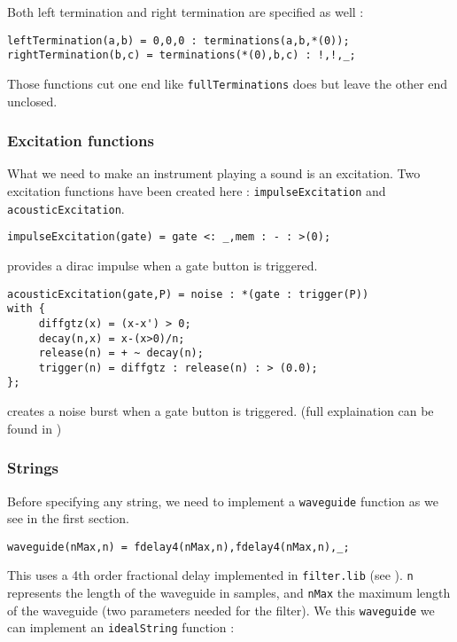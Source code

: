 Both left termination and right termination are specified as well :

\begin{lstlisting}
leftTermination(a,b) = 0,0,0 : terminations(a,b,*(0));
rightTermination(b,c) = terminations(*(0),b,c) : !,!,_;
\end{lstlisting}

Those functions cut one end like \texttt{fullTerminations} does but leave the other end unclosed.

\subsubsection*{Excitation functions}

What we need to make an instrument playing a sound is an excitation. Two excitation functions have been created here : \texttt{impulseExcitation} and \texttt{acousticExcitation}.\\

\begin{lstlisting}
impulseExcitation(gate) = gate <: _,mem : - : >(0);
\end{lstlisting}

provides a dirac impulse when a gate button is triggered.\\

\begin{lstlisting}
acousticExcitation(gate,P) = noise : *(gate : trigger(P))
with {
     diffgtz(x) = (x-x') > 0;
     decay(n,x) = x-(x>0)/n;
     release(n) = + ~ decay(n);
     trigger(n) = diffgtz : release(n) : > (0.0);
};
\end{lstlisting}

creates a noise burst when a gate button is triggered. (full explaination can be found in \cite{lac_orlarey})

\subsubsection*{Strings}

Before specifying any string, we need to implement a \texttt{waveguide} function as we see in the first section.

\begin{lstlisting}
waveguide(nMax,n) = fdelay4(nMax,n),fdelay4(nMax,n),_;
\end{lstlisting}

This uses a 4th order fractional delay implemented in \texttt{filter.lib} (see \cite{filters}). \texttt{n} represents the length of the waveguide in samples, and \texttt{nMax} the maximum length of the waveguide (two parameters needed for the filter). We this \texttt{waveguide} we can implement an \texttt{idealString} function :

